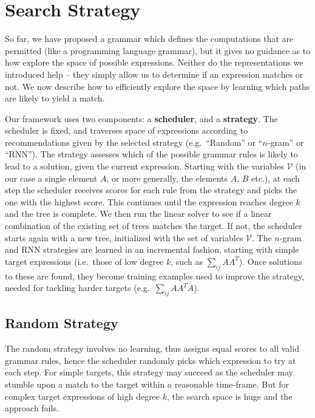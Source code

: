\documentclass{article} %
\begin{document}
\vspace{-2mm}
\section{Search Strategy}
\vspace{-1mm}
\label{sec:search_strategy}
So far, we have proposed a grammar which defines the computations
that are permitted (like a programming language grammar), but it gives
no guidance as to how explore the space of possible expressions. Neither
do the representations we introduced help -- they simply allow us to
determine if an expression matches or not. We now describe how to
efficiently explore the space by learning which paths are likely to
yield a match.

Our framework uses two components: a {\bf scheduler}, and a {\bf
  strategy}. The scheduler is fixed, and traverses space of
expressions according to recommendations given by the selected
strategy (e.g.~``Random'' or ``$n$-gram'' or ``RNN''). The
strategy assesses which of the possible grammar rules is likely to
lead to a solution, given the current expression. Starting with 
the variables $\mathcal{V}$ (in our case a single element $A$, or more
generally, the elements $A$, $B$ etc.), at each step the scheduler receives 
scores for each rule from the strategy and picks the one with the highest
score. This continues until the expression reaches degree $k$ and the tree is
complete. We then run the linear solver to see if a linear combination
of the existing set of trees matches the target. If not, the scheduler
starts again with a new tree, initialized with the set of variables $\mathcal{V}$.
The $n$-gram and RNN strategies are learned in an incremental fashion, starting with simple
target expressions (i.e.~those of low degree $k$, such as $\sum_{ij}
AA^T$). Once solutions to these are found, they become training
examples used to improve the strategy, needed for tackling harder targets (e.g.~$\sum_{ij}
AA^TA$).

\vspace{-1mm}
\subsection{Random Strategy}
\vspace{-1mm} The random strategy involves no learning, thus assigns
equal scores to all valid grammar rules, hence the scheduler randomly
picks which expression to try at each step. For simple targets, this
strategy may succeed as the scheduler may stumble upon a match to the
target within a reasonable time-frame. But for complex target
expressions of high degree $k$, the search space is huge and the
approach fails.
\end{document}

